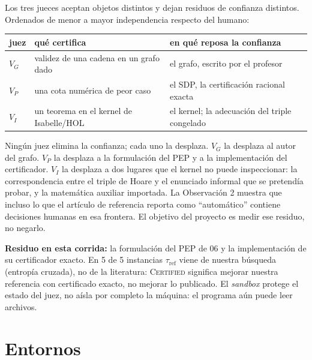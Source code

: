 \documentclass[11pt,a4paper]{article}
\begin{document}
Los tres jueces aceptan objetos distintos y dejan residuos de confianza distintos. Ordenados de menor a mayor independencia respecto del humano:

\begin{center}
\begin{tabular}{@{}lll@{}}
\toprule
juez & qué certifica & en qué reposa la confianza \\
\midrule
$V_G$ & validez de una cadena en un grafo dado & el grafo, escrito por el profesor \\
$V_P$ & una cota numérica de peor caso & el SDP, la certificación racional exacta \\
$V_I$ & un teorema en el kernel de Isabelle/HOL & el kernel; la adecuación del triple congelado \\
\bottomrule
\end{tabular}
\end{center}

Ningún juez elimina la confianza; cada uno la desplaza. $V_G$ la desplaza al autor del grafo. $V_P$ la desplaza a la formulación del PEP y a la implementación del certificador. $V_I$ la desplaza a dos lugares que el kernel no puede inspeccionar: la correspondencia entre el triple de Hoare y el enunciado informal que se pretendía probar, y la matemática auxiliar importada. La Observación 2 muestra que incluso lo que el artículo de referencia reporta como ``automático'' contiene decisiones humanas en esa frontera. El objetivo del proyecto es medir ese residuo, no negarlo.

\textbf{Residuo en esta corrida:} la formulación del PEP de 06 y la implementación de su certificador exacto. En 5 de 5 instancias $\tau_{\mathrm{ref}}$ viene de nuestra búsqueda (entropía cruzada), no de la literatura: \textsc{Certified} significa mejorar nuestra referencia con certificado exacto, no mejorar lo publicado. El \emph{sandbox} protege el estado del juez, no aísla por completo la máquina: el programa aún puede leer archivos.

\section{Entornos}
\end{document}
